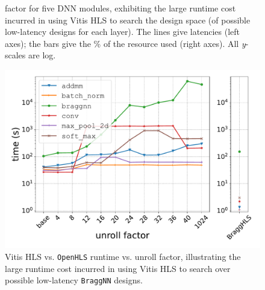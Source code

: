 \documentclass[10pt]{sig-alternate}
\begin{document}
\begin{figure}[!t]
{factor for five DNN modules, exhibiting the large runtime cost incurred in using Vitis HLS to search the design space (of possible low-latency designs for each layer).
The lines give latencies (left axes); the bars give the \% of the resource used (right axes).
All \emph{y}-scales are log.
\label{fig:Resource-usage-and}}
\end{figure}

\begin{figure}[tbh]
\centering{}\includegraphics[width=1\columnwidth,trim=0 8mm 0 7mm,clip]{figures/elapsed_time}\caption{Vitis HLS vs. \texttt{OpenHLS} runtime vs. unroll factor, illustrating the large runtime cost incurred in using Vitis HLS to search over possible low-latency \texttt{BraggNN} designs.
\label{fig:Runtime-of-Vitisa}}
\end{figure}
\end{document}
